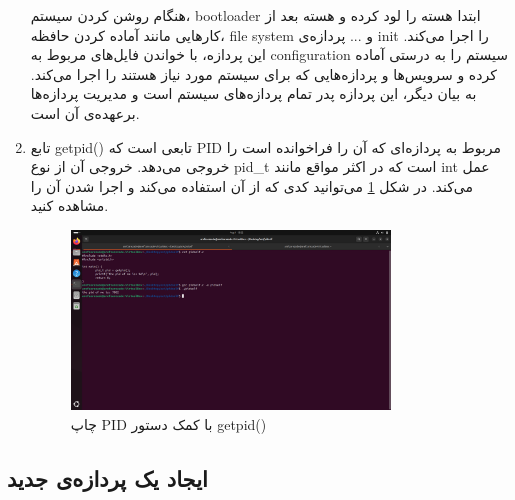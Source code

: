 \documentclass[12pt]{article}
\begin{document}
\begin{enumerate}
        هنگام روشن کردن سیستم،
        \textenglish{bootloader}
        ابتدا هسته را لود کرده و هسته بعد از کارهایی مانند آماده کردن حافظه، 
        \textenglish{file system}
        و ...
        پردازه‌ی 
        \textenglish{init}
        را اجرا می‌کند. این پردازه، با خواندن فایل‌های مربوط به
        \textenglish{configuration}
        سیستم را به درستی آماده کرده و سرویس‌ها و پردازه‌هایی که برای سیستم مورد نیاز هستند را اجرا می‌کند. به بیان دیگر، این پردازه پدر تمام پردازه‌های سیستم است و مدیریت پردازه‌ها برعهده‌ی آن است.

        \item 
        تابع
        \textenglish{getpid()}
        تابعی است که 
        \textenglish{PID}
        مربوط به پردازه‌ای که آن را فراخوانده است را خروجی می‌دهد. خروجی آن از نوع
        \textenglish{pid\_t}
        است که در اکثر مواقع مانند 
        \textenglish{int}
        عمل می‌کند. در شکل
        \ref{im3}
        می‌توانید کدی که از آن استفاده می‌کند و اجرا شدن آن را مشاهده کنید.

        \begin{figure}[H]
		\centering
		\includegraphics[width=0.8\textwidth]{report4-resources/3.png}
		\caption{چاپ \textenglish{PID} با کمک دستور \textenglish{getpid()}}
            \label{im3}
	\end{figure}
        \end{enumerate}

        \subsection{ایجاد یک پردازه‌ی جدید}
\end{document}
